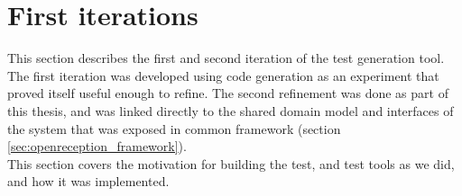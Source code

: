 \chapter{First iterations}
This section describes the first and second iteration of the test generation tool. The first iteration was developed using code generation as an experiment that proved itself useful enough to refine. The second refinement was done as part of this thesis, and was linked directly to the shared domain model and interfaces of the system that was exposed in common framework (section \ref{sec:openreception_framework}).\\
This section covers the motivation for building the test, and test tools as we did, and how it was implemented.
